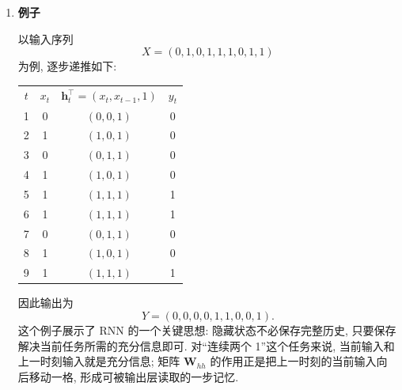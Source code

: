 \documentclass{../nndlcourse}
\begin{document}
\begin{enumerate}
    代回检查:
    \begin{align*}
      \boldsymbol{W}_{hh}\boldsymbol{h}_{t-1}
      &=
      \begin{bmatrix}
        0 \\
        x_{t-1} \\
        1
      \end{bmatrix}, &
      \boldsymbol{W}_{xh}x_t
      &=
      \begin{bmatrix}
        x_t \\
        0 \\
        0
      \end{bmatrix}.
    \end{align*}
    两者相加为
    \begin{equation*}
      \boldsymbol{W}_{hh}\boldsymbol{h}_{t-1} + \boldsymbol{W}_{xh}x_t
      =
      \begin{bmatrix}
        x_t \\
        x_{t-1} \\
        1
      \end{bmatrix}.
    \end{equation*}
    由于这里的三个分量都非负, ReLU 不会改变它们. 因此由归纳可知, 该 RNN 的隐藏状态始终满足 $\boldsymbol{h}_t^\top=(x_t,x_{t-1},1)$.

  \item \textbf{例子}

    以输入序列
    \begin{equation*}
      X=(0,1,0,1,1,1,0,1,1)
    \end{equation*}
    为例, 逐步递推如下:
    \begin{center}
    \begin{tabular}{cccc}
    $t$ & $x_t$ & $\boldsymbol{h}_t^\top=(x_t,x_{t-1},1)$ & $y_t$ \\
    1 & 0 & $(0,0,1)$ & 0 \\
    2 & 1 & $(1,0,1)$ & 0 \\
    3 & 0 & $(0,1,1)$ & 0 \\
    4 & 1 & $(1,0,1)$ & 0 \\
    5 & 1 & $(1,1,1)$ & 1 \\
    6 & 1 & $(1,1,1)$ & 1 \\
    7 & 0 & $(0,1,1)$ & 0 \\
    8 & 1 & $(1,0,1)$ & 0 \\
    9 & 1 & $(1,1,1)$ & 1
    \end{tabular}
    \end{center}
    因此输出为
    \begin{equation*}
      Y=(0,0,0,0,1,1,0,0,1).
    \end{equation*}
    这个例子展示了 RNN 的一个关键思想: 隐藏状态不必保存完整历史, 只要保存解决当前任务所需的充分信息即可. 对“连续两个 1”这个任务来说, 当前输入和上一时刻输入就是充分信息; 矩阵 $\boldsymbol{W}_{hh}$ 的作用正是把上一时刻的当前输入向后移动一格, 形成可被输出层读取的一步记忆.
\end{enumerate}
\end{document}
